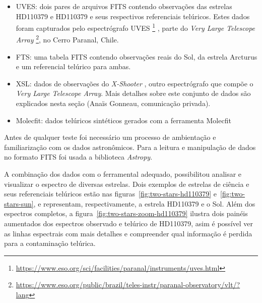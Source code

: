 \begin{itemize}
    \item UVES: dois pares de arquivos FITS contendo observações das estrelas HD110379 e HD110379 e seus respectivos referenciais telúricos. Estes dados foram capturados pelo espectrógrafo UVES \footnote{\url{https://www.eso.org/sci/facilities/paranal/instruments/uves.html}} \citep{2000SPIE.4008..534D}, parte do \textit{Very Large Telescope Array} \footnote{\url{https://www.eso.org/public/brazil/teles-instr/paranal-observatory/vlt/?lang}}, no Cerro Paranal, Chile.
    \item FTS: uma tabela FITS contendo observações reais do Sol, da estrela Arcturus e um referencial telúrico para ambas.
    \item XSL: dados de observações do \textit{X-Shooter} \citep{Chen2014TheXS}, outro espectrógrafo que compõe o \textit{Very Large Telescope Array}. Mais detalhes sobre este conjunto de dados são explicados nesta seção (Anaïs Gonneau, comunicação privada).
    \item Molecfit: dados telúricos sintéticos gerados com a ferramenta Molecfit \citep{smette2015molecfit} 
\end{itemize}

Antes de qualquer teste foi necessário um processo de ambientação e familiarização com os dados astronômicos. Para a leitura e manipulação de dados no formato FITS foi usada a biblioteca \textit{Astropy}.

A combinação dos dados com o ferramental adequado, possibilitou analisar e visualizar o espectro de diversas estrelas. Dois exemplos de estrelas de ciência e seus referenciais telúricos estão nas figuras~\ref{fig:two-stars-hd110379} e~\ref{fig:two-stars-sun}, e representam, respectivamente, a estrela HD110379 e o Sol. Além dos espectros completos, a figura~\ref{fig:two-stars-zoom-hd110379} ilustra dois painéis aumentados dos espectros observado e telúrico de HD110379, asim é possível ver as linhas espectrais com mais detalhes e compreender qual informação é perdida para a contaminação telúrica.

